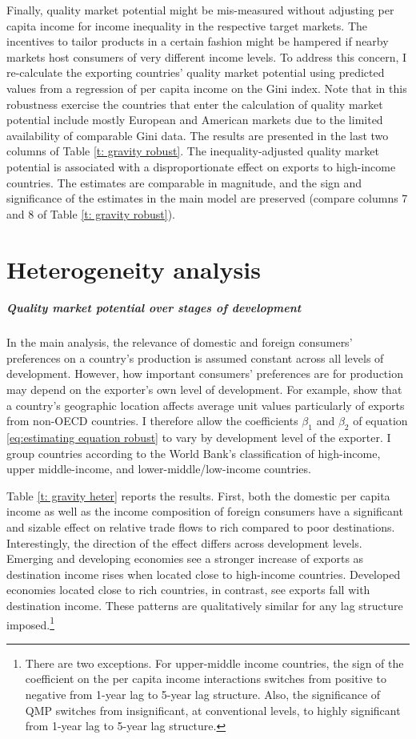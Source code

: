 \documentclass[12pt,a4paper,oneside,times]{article}   	%
\begin{document}
Finally, quality market potential might be mis-measured without adjusting per capita income for income inequality in the respective target markets. The incentives to tailor products in a certain fashion might be hampered if nearby markets host consumers of very different income levels. To address this concern, I re-calculate the exporting countries' quality market potential using predicted values from a regression of per capita income on the Gini index. Note that in this robustness exercise the countries that enter the calculation of quality market potential include mostly European and American markets due to the limited availability of comparable Gini data. The results are presented in the last two columns of Table \ref{t: gravity robust}. The inequality-adjusted quality market potential is associated with a disproportionate effect on exports to high-income countries. The estimates are comparable in magnitude, and the sign and significance of the estimates in the main model are preserved (compare columns 7 and 8 of Table \ref{t: gravity robust}). 

\section{Heterogeneity analysis}
\subparagraph{Quality market potential over stages of development}
In the main analysis, the relevance of domestic and foreign consumers' preferences on a country's production is assumed constant across all levels of development. However, how important consumers' preferences are for production may depend on the exporter's own level of development. For example, \cite{Lugovskyy2015} show that a country's geographic location affects average unit values particularly of exports from non-OECD countries. I therefore allow the coefficients $\beta_1$ and $\beta_2$ of equation \eqref{eq:estimating equation robust} to vary by development level of the exporter. I group countries according to the World Bank's classification of high-income, upper middle-income, and lower-middle/low-income countries. 

Table \ref{t: gravity heter} reports the results. First, both the domestic per capita income as well as the income composition of foreign consumers have a significant and sizable effect on relative trade flows to rich compared to poor destinations. Interestingly, the direction of the effect differs across development levels. Emerging and developing economies see a stronger increase of exports as destination income rises when located close to high-income countries. Developed economies located close to rich countries, in contrast, see exports fall with destination income. These patterns are qualitatively similar for any lag structure imposed.\footnote{There are two exceptions. For upper-middle income countries, the sign of the coefficient on the per capita income interactions switches from positive to negative from 1-year lag to 5-year lag structure. Also, the significance of QMP switches from insignificant, at conventional levels, to highly significant from 1-year lag to 5-year lag structure.}
\end{document}
